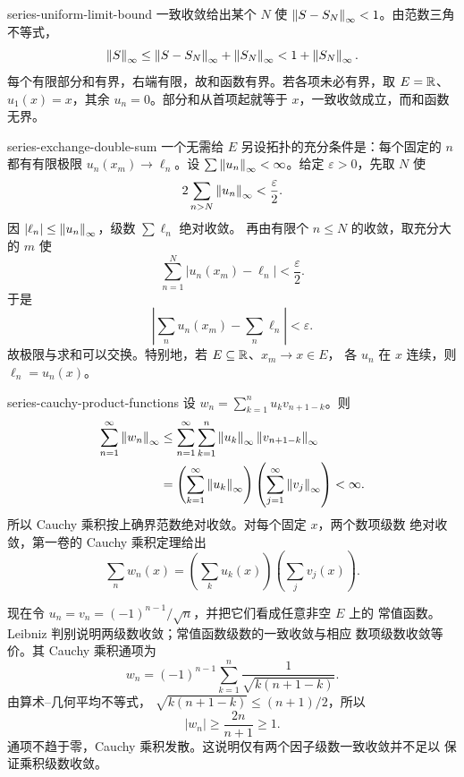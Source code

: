 \begin{solution}{series-uniform-limit-bound}
一致收敛给出某个 \(N\) 使
\(\left\lVert S-S_N\right\rVert_\infty<1\)。由范数三角不等式，
\[
 \left\lVert S\right\rVert_\infty
 \le\left\lVert S-S_N\right\rVert_\infty+\left\lVert S_N\right\rVert_\infty
 <1+\left\lVert S_N\right\rVert_\infty.
\]
每个有限部分和有界，右端有限，故和函数有界。若各项未必有界，取
\(E=\mathbb{R}\)、\(u_1(x)=x\)，其余 \(u_n=0\)。部分和从首项起就等于
\(x\)，一致收敛成立，而和函数无界。
\end{solution}

\begin{solution}{series-exchange-double-sum}
一个无需给 \(E\) 另设拓扑的充分条件是：每个固定的 \(n\) 都有有限极限
\(u_n(x_m)\to\ell_n\)。设
\(\sum\left\lVert u_n\right\rVert_\infty<\infty\)。给定 \(\varepsilon>0\)，先取
\(N\) 使
\[
 2\sum_{n>N}\left\lVert u_n\right\rVert_\infty<\frac{\varepsilon}{2}.
\]
因 \(|\ell_n|\le\left\lVert u_n\right\rVert_\infty\)，级数 \(\sum\ell_n\) 绝对收敛。
再由有限个 \(n\le N\) 的收敛，取充分大的 \(m\) 使
\[
 \sum_{n=1}^N|u_n(x_m)-\ell_n|<\frac{\varepsilon}{2}.
\]
于是
\[
 \left|\sum_nu_n(x_m)-\sum_n\ell_n\right|<\varepsilon.
\]
故极限与求和可以交换。特别地，若 \(E\subseteq\mathbb{R}\)、\(x_m\to x\in E\)，
各 \(u_n\) 在 \(x\) 连续，则 \(\ell_n=u_n(x)\)。
\end{solution}

\begin{solution}{series-cauchy-product-functions}
设 \(w_n=\sum_{k=1}^nu_kv_{n+1-k}\)。则
\[
\begin{aligned}
 \sum_{n=1}^\infty\left\lVert w_n\right\rVert_\infty
 &\le\sum_{n=1}^\infty\sum_{k=1}^n
   \left\lVert u_k\right\rVert_\infty\left\lVert v_{n+1-k}\right\rVert_\infty\\
 &=\left(\sum_{k=1}^\infty\left\lVert u_k\right\rVert_\infty\right)
   \left(\sum_{j=1}^\infty\left\lVert v_j\right\rVert_\infty\right)<\infty.
\end{aligned}
\]
所以 Cauchy 乘积按上确界范数绝对收敛。对每个固定 \(x\)，两个数项级数
绝对收敛，第一卷的 Cauchy 乘积定理给出
\[
 \sum_nw_n(x)=\left(\sum_ku_k(x)\right)
               \left(\sum_jv_j(x)\right).
\]

现在令 \(u_n=v_n=(-1)^{n-1}/\sqrt n\)，并把它们看成任意非空 \(E\) 上的
常值函数。Leibniz 判别说明两级数收敛；常值函数级数的一致收敛与相应
数项级数收敛等价。其 Cauchy 乘积通项为
\[
 w_n=(-1)^{n-1}\sum_{k=1}^n\frac1{\sqrt{k(n+1-k)}}.
\]
由算术--几何平均不等式，
\(\sqrt{k(n+1-k)}\le(n+1)/2\)，所以
\[
 |w_n|\ge\frac{2n}{n+1}\ge1.
\]
通项不趋于零，Cauchy 乘积发散。这说明仅有两个因子级数一致收敛并不足以
保证乘积级数收敛。
\end{solution}
